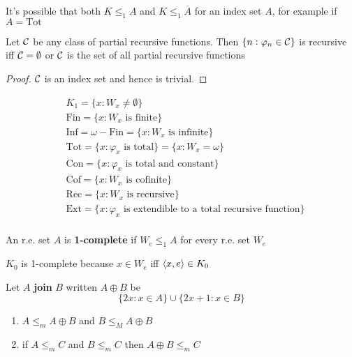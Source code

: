 \documentclass[11pt]{article}
\begin{document}
It's possible that both \(K\le_1 A\) and \(K\le_1\overline{A}\) for an index set
\(A\), for example if \(A=\text{Tot}\)
\begin{corollary}
Let \(\mathcal{C}\) be any class of partial recursive functions. Then
\(\{n:\varphi_n\in\mathcal{C}\}\) is recursive iff \(\mathcal{C}=\emptyset\) or \(\mathcal{C}\) is
the set of all partial recursive functions
\end{corollary}
\begin{proof}
\(\mathcal{C}\) is an index set and hence is trivial.
\end{proof}
\begin{definition}[]
\begin{align*}
&K_1=\{x:W_x\neq\emptyset\}\\
&\text{Fin}=\{x:W_x\text{ is finite}\}\\
&\text{Inf}=\omega-\text{Fin}=\{x:W_x\text{ is infinite}\}\\
&\text{Tot}=\{x:\varphi_x\text{ is total}\}=\{x:W_x=\omega\}\\
&\text{Con}=\{x:\varphi_x\text{ is total and constant}\}\\
&\text{Cof}=\{x:W_x\text{ is cofinite}\}\\
&\text{Rec}=\{x:W_x\text{ is recursive}\}\\
&\text{Ext}=\{x:\varphi_x\text{ is extendible to a total recursive function}\}\\
\end{align*}
\end{definition}
\begin{definition}[]
An r.e. set \(A\) is \textbf{1-complete} if \(W_e\le_1 A\) for every r.e. set \(W_e\)
\end{definition}

\(K_0\) is 1-complete because \(x\in W_e\) iff \(\langle x,e\rangle\in K_0\)

\begin{definition}[]
Let \(A\) \textbf{join} \(B\) written \(A\oplus B\) be
\begin{equation*}
\{2x:x\in A\}\cup\{2x+1:x\in B\}
\end{equation*}
\end{definition}
\begin{exercise}
\begin{enumerate}
\item \(A\le_m A\oplus B\) and \(B\le_M A\oplus B\)
\item if \(A\le_m C\) and \(B\le_m C\) then \(A\oplus B\le_m C\)
\end{enumerate}
\end{exercise}
\end{document}
